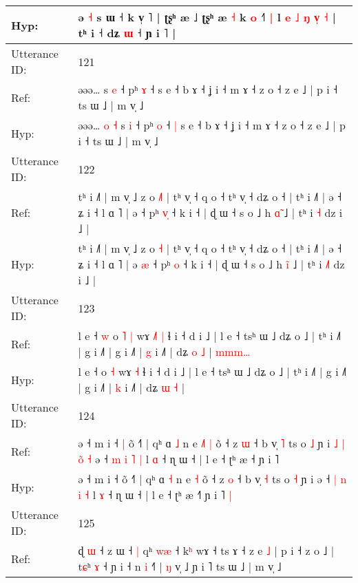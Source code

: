 \documentclass[10pt]{article}
\DeclareRobustCommand{\hl}[1]{{\textcolor{red}{#1}}}
\begin{document}
\begin{longtable}{ll}
 \\
Hyp: & ə \hl{˧} s ɯ ˧ k v̩ ˥ | ʈʂʰ æ ˩ ʈʂʰ æ\hl{}\hl{}\hl{} \hl{˧} k \hl{o} ˧\hl{}\hl{}\hl{˥} \hl{|} l \hl{}\hl{e} \hl{˩} \hl{ŋ} \hl{v}\hl{̩} \hl{˧} | tʰ i ˧ dʑ \hl{ɯ} ˧ ɲ i ˥\hl{}\hl{}\hl{}\hl{}\hl{}\hl{} |
 \\
\midrule
Utterance ID: & 121 \\
Ref: & əəə…\hl{}\hl{}\hl{}\hl{} s \hl{e} ˧ pʰ \hl{ɤ} ˧\hl{}\hl{} s e ˧ b ɤ ˧ ʝ i ˧ m ɤ ˧ z o ˧ z e ˩ | p i ˧ ts ɯ ˩ | m v̩ ˩
 \\
Hyp: & əəə…\hl{ }\hl{o}\hl{ }\hl{˧} s \hl{i} ˧ pʰ \hl{o} ˧\hl{ }\hl{|} s e ˧ b ɤ ˧ ʝ i ˧ m ɤ ˧ z o ˧ z e ˩ | p i ˧ ts ɯ ˩ | m v̩ ˩
 \\
\midrule
Utterance ID: & 122 \\
Ref: & tʰ i ˩˥ | m v̩ ˩ z o \hl{˩}\hl{˥} | tʰ v̩ ˧ q o ˧ tʰ v̩ ˧ dʑ o ˧ | tʰ i ˩˥ | ə ˧ ʑ i ˧ l ɑ ˥ | ə\hl{}\hl{} ˧ pʰ \hl{v}\hl{̩} ˧ k i ˧ | ɖ ɯ ˧ s o ˩ h \hl{ɑ}̃ ˩ | tʰ i \hl{}\hl{˧} dz i ˩ |
 \\
Hyp: & tʰ i ˩˥ | m v̩ ˩ z o \hl{}\hl{˧} | tʰ v̩ ˧ q o ˧ tʰ v̩ ˧ dʑ o ˧ | tʰ i ˩˥ | ə ˧ ʑ i ˧ l ɑ ˥ | ə\hl{ }\hl{æ} ˧ pʰ \hl{}\hl{o} ˧ k i ˧ | ɖ ɯ ˧ s o ˩ h \hl{i}̃ ˩ | tʰ i \hl{˩}\hl{˥} dz i ˩ |
 \\
\midrule
Utterance ID: & 123 \\
Ref: & l e ˧\hl{ }\hl{w} o\hl{ }\hl{˥} \hl{|} wɤ\hl{ }\hl{˩}\hl{˥} \hl{|} ɬ i ˧ d i ˩ | l e ˧ tsʰ ɯ ˩ dʑ o ˩ | tʰ i ˩˥ | g i ˩˥ | g i ˩˥ | \hl{g} i ˩˥ | dʑ \hl{o} \hl{˩} |\hl{ }\hl{m}\hl{m}\hl{m}\hl{…}
 \\
Hyp: & l e ˧\hl{}\hl{} o\hl{}\hl{} \hl{˧} wɤ\hl{}\hl{}\hl{} \hl{˧} ɬ i ˧ d i ˩ | l e ˧ tsʰ ɯ ˩ dʑ o ˩ | tʰ i ˩˥ | g i ˩˥ | g i ˩˥ | \hl{k} i ˩˥ | dʑ \hl{ɯ} \hl{˧} |\hl{}\hl{}\hl{}\hl{}\hl{}
 \\
\midrule
Utterance ID: & 124 \\
Ref: & ə ˧ m i ˧\hl{ }\hl{|} õ ˧˥ | qʰ ɑ \hl{˩} n e\hl{ }\hl{˩}\hl{˥} \hl{|} õ ˧ z \hl{ɯ} ˧ b v̩ \hl{˥} ts o \hl{˩} ɲ i\hl{ }\hl{˩}\hl{ }\hl{|}\hl{ }\hl{o}\hl{̃}\hl{ }\hl{˧} ə ˧ \hl{m} \hl{i} \hl{˥} \hl{|} l \hl{ɑ} ˧ ɳ ɯ ˧ | l e ˧ ʈʰ æ ˧\hl{} ɲ i ˥\hl{}\hl{}
 \\
Hyp: & ə ˧ m i ˧\hl{}\hl{} õ ˧˥ | qʰ ɑ \hl{˧} n e\hl{}\hl{}\hl{} \hl{˧} õ ˧ z \hl{o} ˧ b v̩ \hl{˧} ts o \hl{˧} ɲ i\hl{}\hl{}\hl{}\hl{}\hl{}\hl{}\hl{}\hl{}\hl{} ə ˧ \hl{|} \hl{n} \hl{i} \hl{˧} l \hl{ɤ} ˧ ɳ ɯ ˧ | l e ˧ ʈʰ æ ˧\hl{˥} ɲ i ˥\hl{ }\hl{|}
 \\
\midrule
Utterance ID: & 125 \\
Ref: & ɖ \hl{ɯ} ˧ z ɯ ˧\hl{ }\hl{|} qʰ \hl{w}\hl{æ} ˧ k\hl{ʰ} wɤ ˧ ts ɤ ˧ z e \hl{˩} | p i ˧ z o ˩ | t\hl{ɕ}ʰ \hl{ɤ} ˧ ɲ i ˧ n \hl{i} ˧\hl{}\hl{}\hl{}\hl{}\hl{}˥ | \hl{ŋ} v̩ ˩ ɲ i ˥ ts ɯ ˩ | m v̩ ˩

\end{longtable}
\end{document}
